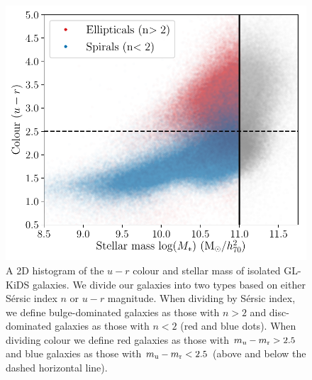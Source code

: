 \documentclass[usenatbib]{mnras}
\newcommand{\un}[1]{_{\rm #1}}
\begin{document}
\begin{figure}
	\includegraphics[width=\columnwidth]{Figures/galaxy_morphology_color_u-r.pdf}
	\caption{A 2D histogram of the $u-r$ colour and stellar mass of isolated GL-KiDS galaxies. We divide our galaxies into two types based on either S\'ersic index $n$ or $u-r$ magnitude. When dividing by S\'ersic index, we define bulge-dominated galaxies as those with $n>2$ and disc-dominated galaxies as those with $n<2$ (red and blue dots). When dividing colour we define red galaxies as those with $m\un{u} - m\un{r} > 2.5$ and blue galaxies as those with $m\un{u} - m\un{r} < 2.5$ (above and below the dashed horizontal line).}
	\label{fig:galtypes_scatterplot}
\end{figure}
\end{document}
